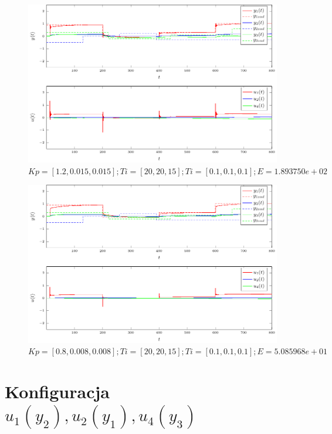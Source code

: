 \documentclass[a4paper,titlepage,11pt,twosides,floatssmall]{mwrep}
\begin{document}
\begin{figure}[H]
	\centering
	\includegraphics[scale=1]{../wykresy/zad4_pid_2_2.pdf}
	\caption{$Kp = [1.2, 0.015, 0.015]; Ti = [20, 20, 15]; Ti = [0.1, 0.1, 0.1]; E = 1.893750e+02$}
\end{figure}

\begin{figure}[H]
	\centering
	\includegraphics[scale=1]{../wykresy/zad4_pid_2_3.pdf}
	\caption{$Kp = [0.8, 0.008, 0.008]; Ti = [20, 20, 15]; Ti = [0.1, 0.1, 0.1]; E = 5.085968e+01$}
\end{figure}



\section*{Konfiguracja $u_1(y_2), u_2(y_1), u_4(y_3)$}
\end{document}

